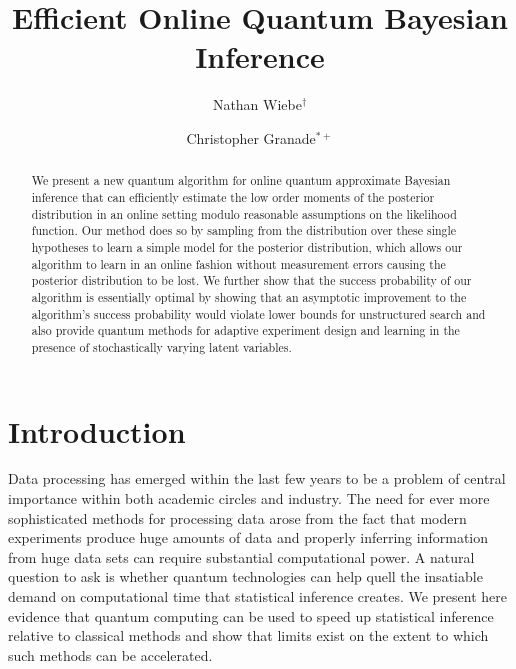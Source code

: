 \documentclass[aps,amsmath,onecolumn,amssymb]{revtex4}
\begin{document}
\newcommand{\id}{\openone}


\title{Efficient Online Quantum Bayesian Inference}
\author{Nathan Wiebe$^\dagger$}
\author{Christopher Granade$^{*+}$}
\begin{abstract}
We present a new quantum algorithm for online quantum approximate Bayesian inference that can efficiently estimate the low order moments of the posterior distribution in an online setting modulo reasonable assumptions on the likelihood function.  Our method does so by sampling from the distribution over these single hypotheses to learn a simple model for the posterior distribution, which allows our algorithm to learn in an online fashion without measurement errors causing the posterior distribution to be lost.  We further show that the success probability of our algorithm is essentially optimal by showing that an asymptotic improvement to the algorithm's success probability would violate lower bounds for unstructured search and also provide quantum methods for adaptive experiment design and learning in the presence of stochastically varying latent variables.\end{abstract}
\maketitle
\section{Introduction}
Data processing has emerged within the last few years to be a problem of central importance within both academic circles and industry.  The need for ever more sophisticated methods for processing data arose from the fact that modern experiments produce huge amounts of data and properly inferring information from huge data sets can require substantial computational power.  A natural question to ask is whether quantum technologies can help quell the insatiable demand on computational time that statistical inference creates.  We present here evidence that quantum computing can be used to speed up statistical inference relative to classical methods and show that limits exist on the extent to which such methods can be accelerated.  
\end{document}
